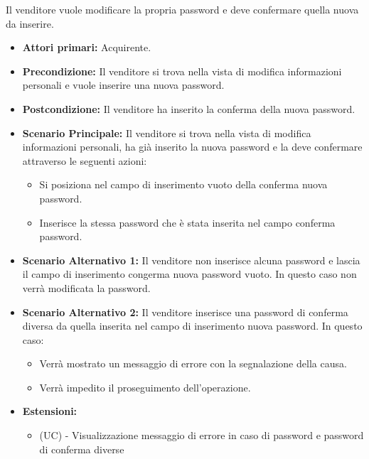 Il venditore vuole modificare la propria password e deve confermare quella nuova da inserire.
\begin{itemize}
    \item \textbf{Attori primari:} Acquirente.
    \item \textbf{Precondizione:} Il venditore si trova nella vista di modifica informazioni personali e vuole inserire una nuova password.
    \item \textbf{Postcondizione:} Il venditore ha inserito la conferma della nuova password.
    \item \textbf{Scenario Principale:} Il venditore si trova nella vista di modifica informazioni personali, ha già inserito la nuova password e la deve confermare attraverso le seguenti azioni:
        \begin{itemize}
            \item Si posiziona nel campo di inserimento vuoto della conferma nuova password.
            \item Inserisce la stessa password che è stata inserita nel campo conferma password.
        \end{itemize}
    \item \textbf{Scenario Alternativo 1:} Il venditore non inserisce alcuna password e lascia il campo di inserimento congerma nuova password vuoto. In questo caso non verrà modificata la password.
    \item \textbf{Scenario Alternativo 2:} Il venditore inserisce una password di conferma diversa da quella inserita nel campo di inserimento nuova password. In questo caso:
    \begin{itemize}
        \item Verrà mostrato un messaggio di errore con la segnalazione della causa.
        \item Verrà impedito il proseguimento dell'operazione.
    \end{itemize}
    \item \textbf{Estensioni:}
    \begin{itemize}
        \item (UC) - Visualizzazione messaggio di errore in caso di password e password di conferma diverse
    \end{itemize}
\end{itemize}


